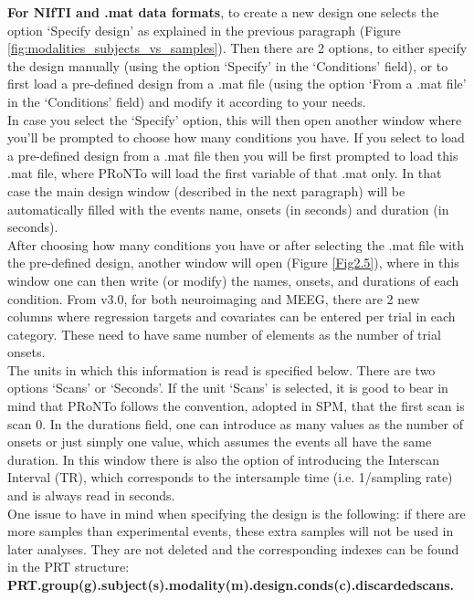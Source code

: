 \textbf{For NIfTI and .mat data formats}, to create a new design one selects the option `Specify design' as explained in the previous paragraph (Figure \ref{fig:modalities_subjects_vs_samples}). Then there are 2 options, to either specify the design manually (using the option `Specify' in the `Conditions' field), or to first load a pre-defined design from a .mat file (using  the option `From a .mat file' in the `Conditions' field) and modify it according to your needs.
\\

In case you select the `Specify' option, this will then open another window where you'll be prompted to choose how many conditions you have. If you select to load a pre-defined design from a .mat file then you will be first prompted to load this .mat file, where PRoNTo will load the first variable of that .mat only. In that case the main design window (described in the next paragraph) will be automatically filled with the events name, onsets (in seconds) and duration (in seconds).
\\

After choosing how many conditions you have or after selecting the .mat file with the pre-defined design, another window will open (Figure \ref{Fig2.5}), where in this window one can then write (or modify) the names, onsets, and durations of each condition. From v3.0, for both neuroimaging and MEEG, there are 2 new columns where regression targets and covariates can be entered per trial in each category. These need to have same number of elements as the number of trial onsets.
\\

The units in which this information is read is specified below. There are two options `Scans' or `Seconds'. If the unit `Scans' is selected, it is good to bear in mind that PRoNTo follows the convention, adopted in SPM, that the first scan is scan 0. In the durations field, one can introduce as many values as the number of onsets or just simply one value, which assumes the events all have the same duration. In this window there is also the option of introducing the Interscan Interval (TR), which corresponds to the intersample time (i.e. 1/sampling rate) and is always read in seconds.
\\

One issue to have in mind when specifying the design is the following: if there are more samples than experimental events, these extra samples will not be used in later analyses. They are not deleted and the corresponding indexes can be found in the PRT structure: \\ \textbf{PRT.group(g).subject(s).modality(m).design.conds(c).discardedscans.}
\\


